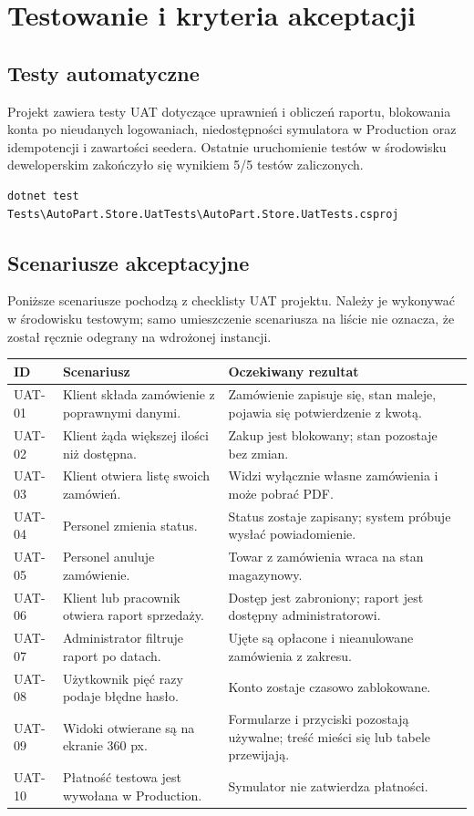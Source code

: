 \documentclass[12pt,a4paper]{article}
\begin{document}
\section{Testowanie i kryteria akceptacji}

\subsection{Testy automatyczne}
Projekt zawiera testy UAT dotyczące uprawnień i obliczeń raportu, blokowania
konta po nieudanych logowaniach, niedostępności symulatora w Production oraz
idempotencji i zawartości seedera. Ostatnie uruchomienie testów w środowisku
deweloperskim zakończyło się wynikiem 5/5 testów zaliczonych.

\begin{lstlisting}[caption={Polecenie uruchamiające testy UAT w PowerShell}]
dotnet test Tests\AutoPart.Store.UatTests\AutoPart.Store.UatTests.csproj
\end{lstlisting}

\subsection{Scenariusze akceptacyjne}
Poniższe scenariusze pochodzą z checklisty UAT projektu. Należy je wykonywać
w środowisku testowym; samo umieszczenie scenariusza na liście nie oznacza,
że został ręcznie odegrany na wdrożonej instancji.

\begin{longtable}{@{}p{}p{}p{}@{}}
\toprule
\textbf{ID} & \textbf{Scenariusz} & \textbf{Oczekiwany rezultat}\\
\midrule
\endhead
UAT-01 & Klient składa zamówienie z poprawnymi danymi. & Zamówienie zapisuje się, stan maleje, pojawia się potwierdzenie z kwotą.\\
UAT-02 & Klient żąda większej ilości niż dostępna. & Zakup jest blokowany; stan pozostaje bez zmian.\\
UAT-03 & Klient otwiera listę swoich zamówień. & Widzi wyłącznie własne zamówienia i może pobrać PDF.\\
UAT-04 & Personel zmienia status. & Status zostaje zapisany; system próbuje wysłać powiadomienie.\\
UAT-05 & Personel anuluje zamówienie. & Towar z zamówienia wraca na stan magazynowy.\\
UAT-06 & Klient lub pracownik otwiera raport sprzedaży. & Dostęp jest zabroniony; raport jest dostępny administratorowi.\\
UAT-07 & Administrator filtruje raport po datach. & Ujęte są opłacone i nieanulowane zamówienia z zakresu.\\
UAT-08 & Użytkownik pięć razy podaje błędne hasło. & Konto zostaje czasowo zablokowane.\\
UAT-09 & Widoki otwierane są na ekranie 360 px. & Formularze i przyciski pozostają używalne; treść mieści się lub tabele przewijają.\\
UAT-10 & Płatność testowa jest wywołana w Production. & Symulator nie zatwierdza płatności.\\
\bottomrule
\end{longtable}
\end{document}
